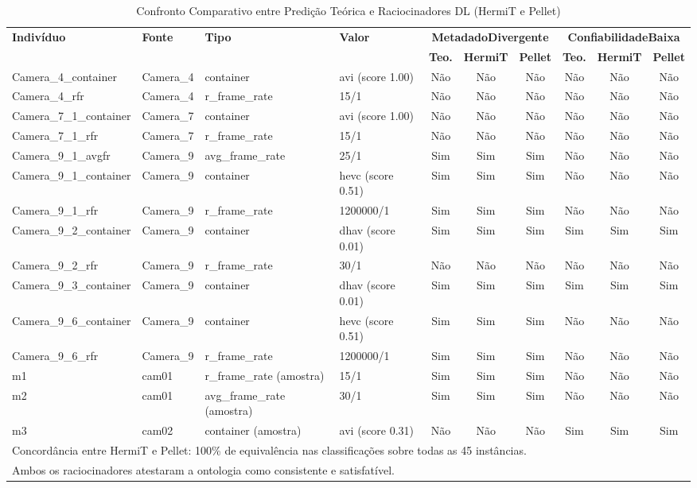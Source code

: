 \begin{table}[t]
\centering
\small
\caption{Confronto Comparativo entre Predição Teórica e Raciocinadores DL (HermiT e Pellet)}
\label{tab:comparativo-hermit-pellet}
\begin{tabular}{llllcccccc}
\hline
\textbf{Indivíduo} & \textbf{Fonte} & \textbf{Tipo} & \textbf{Valor} & \multicolumn{3}{c}{\textbf{MetadadoDivergente}} & \multicolumn{3}{c}{\textbf{ConfiabilidadeBaixa}} \\
 & & & & \textbf{Teo.} & \textbf{HermiT} & \textbf{Pellet} & \textbf{Teo.} & \textbf{HermiT} & \textbf{Pellet} \\
\hline
Camera\_4\_container & Camera\_4 & container & avi (score 1.00) & Não & Não & Não & Não & Não & Não \\
Camera\_4\_rfr & Camera\_4 & r\_frame\_rate & 15/1 & Não & Não & Não & Não & Não & Não \\
Camera\_7\_1\_container & Camera\_7 & container & avi (score 1.00) & Não & Não & Não & Não & Não & Não \\
Camera\_7\_1\_rfr & Camera\_7 & r\_frame\_rate & 15/1 & Não & Não & Não & Não & Não & Não \\
Camera\_9\_1\_avgfr & Camera\_9 & avg\_frame\_rate & 25/1 & Sim & Sim & Sim & Não & Não & Não \\
Camera\_9\_1\_container & Camera\_9 & container & hevc (score 0.51) & Sim & Sim & Sim & Não & Não & Não \\
Camera\_9\_1\_rfr & Camera\_9 & r\_frame\_rate & 1200000/1 & Sim & Sim & Sim & Não & Não & Não \\
Camera\_9\_2\_container & Camera\_9 & container & dhav (score 0.01) & Sim & Sim & Sim & Sim & Sim & Sim \\
Camera\_9\_2\_rfr & Camera\_9 & r\_frame\_rate & 30/1 & Não & Não & Não & Não & Não & Não \\
Camera\_9\_3\_container & Camera\_9 & container & dhav (score 0.01) & Sim & Sim & Sim & Sim & Sim & Sim \\
Camera\_9\_6\_container & Camera\_9 & container & hevc (score 0.51) & Sim & Sim & Sim & Não & Não & Não \\
Camera\_9\_6\_rfr & Camera\_9 & r\_frame\_rate & 1200000/1 & Sim & Sim & Sim & Não & Não & Não \\
m1 & cam01 & r\_frame\_rate (amostra) & 15/1 & Sim & Sim & Sim & Não & Não & Não \\
m2 & cam01 & avg\_frame\_rate (amostra) & 30/1 & Sim & Sim & Sim & Não & Não & Não \\
m3 & cam02 & container (amostra) & avi (score 0.31) & Não & Não & Não & Sim & Sim & Sim \\
\hline
\multicolumn{10}{l}{\footnotesize Concordância entre HermiT e Pellet: 100\% de equivalência nas classificações sobre todas as 45 instâncias.} \\
\multicolumn{10}{l}{\footnotesize Ambos os raciocinadores atestaram a ontologia como consistente e satisfatível.} \\
\hline
\end{tabular}
\end{table}